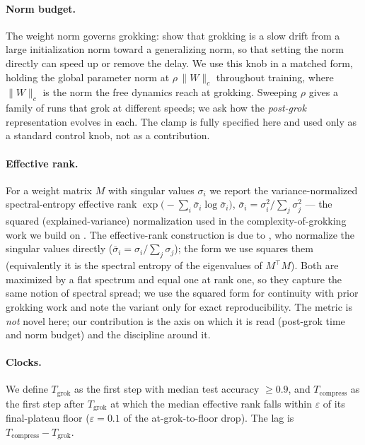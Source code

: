 \documentclass[11pt]{article}
\begin{document}
\paragraph{Norm budget.} The weight norm governs grokking: \citet{omnigrok} show that grokking is a slow
drift from a large initialization norm toward a generalizing norm, so that setting the norm directly can
speed up or remove the delay. We use this knob in a matched form, holding the global parameter norm at
$\rho\,\lVert W\rVert_c$ throughout training, where $\lVert W\rVert_c$ is the norm the free dynamics reach
at grokking. Sweeping $\rho$ gives a family of runs that grok at different speeds; we ask how the
\emph{post-grok} representation evolves in each. The clamp is fully specified here and used only as a
standard control knob, not as a contribution.

\paragraph{Effective rank.} For a weight matrix $M$ with singular values $\sigma_i$ we report the
variance-normalized spectral-entropy effective rank $\exp\!\big(-\sum_i \bar\sigma_i \log \bar\sigma_i\big)$,
$\bar\sigma_i=\sigma_i^2/\sum_j\sigma_j^2$ --- the squared (explained-variance) normalization used in the
complexity-of-grokking work we build on \citep{demoss2024complexity}. The effective-rank construction is
due to \citet{roy2007effective}, who normalize the singular values directly
($\bar\sigma_i=\sigma_i/\sum_j\sigma_j$); the form we use squares them (equivalently it is the spectral
entropy of the eigenvalues of $M^\top M$). Both are maximized by a flat spectrum and equal one at rank
one, so they capture the same notion of spectral spread; we use the squared form for continuity with
prior grokking work and note the variant only for exact reproducibility. The metric is \emph{not} novel
here; our contribution is the axis on which it is read (post-grok time and norm budget) and the
discipline around it.

\paragraph{Clocks.} We define $T_{\mathrm{grok}}$ as the first step with median test accuracy
$\ge 0.9$, and $T_{\mathrm{compress}}$ as the first step after $T_{\mathrm{grok}}$ at which the median
effective rank falls within $\varepsilon$ of its final-plateau floor ($\varepsilon=0.1$ of the
at-grok-to-floor drop). The lag is $T_{\mathrm{compress}}-T_{\mathrm{grok}}$.
\end{document}
